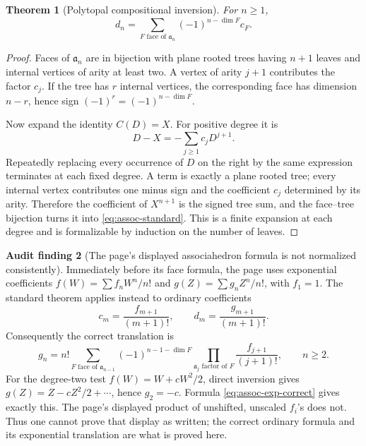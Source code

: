 \documentclass[11pt]{article}
\newtheorem{theorem}{Theorem}[section]
\theoremstyle{definition}
\newtheorem{audit}[theorem]{Audit finding}
\begin{document}
\begin{theorem}[Polytopal compositional inversion]\label{thm:assoc}
For \(n\ge1\),
\begin{equation}\label{eq:assoc-standard}
 d_n=\sum_{F\text{ face of }\mathfrak a_n}
       (-1)^{n-\dim F}c_F.
\end{equation}
\end{theorem}
\begin{proof}
Faces of \(\mathfrak a_n\) are in bijection with plane rooted trees having
\(n+1\) leaves and internal vertices of arity at least two.  A vertex of arity
\(j+1\) contributes the factor \(c_j\).  If the tree has \(r\) internal
vertices, the corresponding face has dimension \(n-r\), hence sign
\((-1)^r=(-1)^{n-\dim F}\).

Now expand the identity \(C(D)=X\).  For positive degree it is
\[
 D-X=-\sum_{j\ge1}c_jD^{j+1}.
\]
Repeatedly replacing every occurrence of \(D\) on the right by the same
expression terminates at each fixed degree.  A term is exactly a plane rooted
tree; every internal vertex contributes one minus sign and the coefficient
\(c_j\) determined by its arity.  Therefore the coefficient of \(X^{n+1}\) is
the signed tree sum, and the face--tree bijection turns it into
\eqref{eq:assoc-standard}.  This is a finite expansion at each degree and is
formalizable by induction on the number of leaves.
\end{proof}

\begin{audit}[The page's displayed associahedron formula is not normalized
consistently]\label{audit:assoc}
Immediately before its face formula, the page uses exponential coefficients
\(f(W)=\sum f_nW^n/n!\) and \(g(Z)=\sum g_nZ^n/n!\), with \(f_1=1\).
The standard theorem applies instead to ordinary coefficients
\[
 c_m=\frac{f_{m+1}}{(m+1)!},\qquad
 d_m=\frac{g_{m+1}}{(m+1)!}.
\]
Consequently the correct translation is
\begin{equation}\label{eq:assoc-exp-correct}
 g_n=n!\sum_{F\text{ face of }\mathfrak a_{n-1}}
 (-1)^{n-1-\dim F}
 \prod_{\mathfrak a_j\text{ factor of }F}
       \frac{f_{j+1}}{(j+1)!},\qquad n\ge2.
\end{equation}
For the degree-two test
\(f(W)=W+cW^2/2\), direct inversion gives
\(g(Z)=Z-cZ^2/2+\cdots\), hence \(g_2=-c\).  Formula
\eqref{eq:assoc-exp-correct} gives exactly this.  The page's displayed product
of unshifted, unscaled \(f_i\)'s does not.  Thus one cannot prove that display
as written; the correct ordinary formula and its exponential translation are
what is proved here.
\end{audit}
\end{document}
